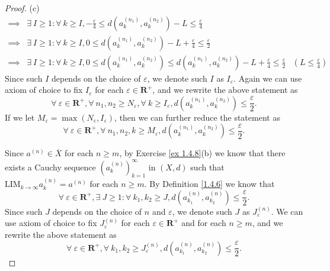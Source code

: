 \begin{proof}{(c)}
\begin{align*}
        \implies & \exists\ I \geq 1 : \forall\ k \geq I, -\frac{\varepsilon}{4} \leq d(a_k^{(n_1)}, a_k^{(n_2)}) - L \leq \frac{\varepsilon}{4}                                                                      \\
        \implies & \exists\ I \geq 1 : \forall\ k \geq I, 0 \leq d(a_k^{(n_1)}, a_k^{(n_2)}) - L + \frac{\varepsilon}{4} \leq \frac{\varepsilon}{2}                                                                   \\
        \implies & \exists\ I \geq 1 : \forall\ k \geq I, 0 \leq d(a_k^{(n_1)}, a_k^{(n_2)}) \leq d(a_k^{(n_1)}, a_k^{(n_2)}) - L + \frac{\varepsilon}{4} \leq \frac{\varepsilon}{2} & (L \leq \frac{\varepsilon}{4})
    \end{align*}
    Since such \(I\) depends on the choice of \(\varepsilon\), we denote such \(I\) as \(I_\varepsilon\).
    Again we can use axiom of choice to fix \(I_\varepsilon\) for each \(\varepsilon \in \mathbf{R}^+\), and we rewrite the above statement as
    \[
        \forall\ \varepsilon \in \mathbf{R}^+, \forall\ n_1, n_2 \geq N_\varepsilon, \forall\ k \geq I_\varepsilon, d(a_k^{(n_1)}, a_k^{(n_2)}) \leq \frac{\varepsilon}{2}.
    \]
    If we let \(M_\varepsilon = \max(N_\varepsilon, I_\varepsilon)\), then we can further reduce the statement as
    \[
        \forall\ \varepsilon \in \mathbf{R}^+, \forall\ n_1, n_2, k \geq M_\varepsilon, d(a_k^{(n_1)}, a_k^{(n_2)}) \leq \frac{\varepsilon}{2}.
    \]

    Since \(a^{(n)} \in \overline{X}\) for each \(n \geq m\), by Exercise \ref{ex 1.4.8}(b) we know that there exists a Cauchy sequence \((a_k^{(n)})_{k = 1}^\infty\) in \((X, d)\) such that \(\text{LIM}_{k \to \infty} a_k^{(n)} = a^{(n)}\) for each \(n \geq m\).
    By Definition \ref{1.4.6} we know that
    \[
        \forall\ \varepsilon \in \mathbf{R}^+, \exists\ J \geq 1 : \forall\ k_1, k_2 \geq J, d(a_{k_1}^{(n)}, a_{k_2}^{(n)}) \leq \frac{\varepsilon}{2}.
    \]
    Since such \(J\) depends on the choice of \(n\) and \(\varepsilon\), we denote such \(J\) as \(J_\varepsilon^{(n)}\).
    We can use axiom of choice to fix \(J_\varepsilon^{(n)}\) for each \(\varepsilon \in \mathbf{R}^+\) and for each \(n \geq m\), and we rewrite the above statement as
    \[
        \forall\ \varepsilon \in \mathbf{R}^+, \forall\ k_1, k_2 \geq J_\varepsilon^{(n)}, d(a_{k_1}^{(n)}, a_{k_2}^{(n)}) \leq \frac{\varepsilon}{2}.
    \]


\end{proof}
